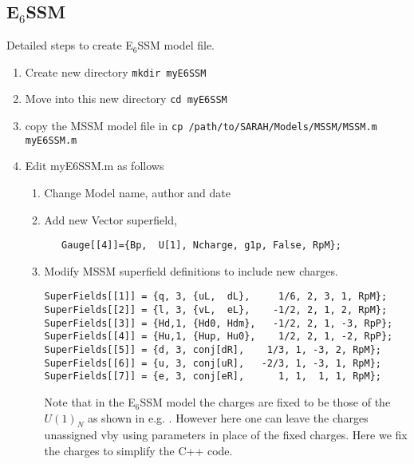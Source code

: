\documentclass[final,3p,times,pdflatex]{elsarticle}
\newcommand{\ESSM}{E$_6$SSM\xspace}
\newcommand{\code}[1]{\lstinline|#1|}  %
\begin{document}
\subsection{\ESSM}
Detailed steps to create \ESSM model file.
\begin{enumerate}
\item Create new directory \code{mkdir myE6SSM}
\item Move into this new directory \code{cd myE6SSM}
\item copy the MSSM model file in \code{cp /path/to/SARAH/Models/MSSM/MSSM.m  myE6SSM.m}
\item Edit myE6SSM.m as follows
\begin{enumerate}
\item  Change Model name, author and date
\item Add new Vector superfield,
 \begin{lstlisting} 
   Gauge[[4]]={Bp,  U[1], Ncharge, g1p, False, RpM};
 \end{lstlisting}
\item Modify MSSM superfield definitions to include new charges.
\begin{lstlisting}
SuperFields[[1]] = {q, 3, {uL,  dL},     1/6, 2, 3, 1, RpM};  
SuperFields[[2]] = {l, 3, {vL,  eL},    -1/2, 2, 1, 2, RpM};
SuperFields[[3]] = {Hd,1, {Hd0, Hdm},   -1/2, 2, 1, -3, RpP};
SuperFields[[4]] = {Hu,1, {Hup, Hu0},    1/2, 2, 1, -2, RpP};
SuperFields[[5]] = {d, 3, conj[dR],    1/3, 1, -3, 2, RpM};
SuperFields[[6]] = {u, 3, conj[uR],   -2/3, 1, -3, 1, RpM};
SuperFields[[7]] = {e, 3, conj[eR],      1, 1,  1, 1, RpM};
\end{lstlisting}
Note that in the \ESSM model the charges are fixed to be those of the $U(1)_N$ as shown in e.g. \cite{King:2005jy}.  However here one can leave the charges unassigned vby using parameters in place of the fixed charges.  Here we fix the charges to simplify the C++ code.


\end{enumerate}
\end{enumerate}
\end{document}
